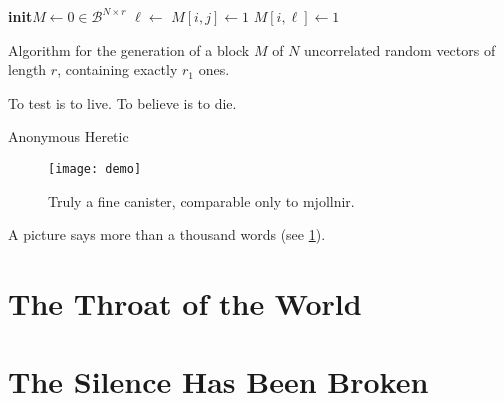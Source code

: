 \documentclass[a4paper,11pt]{memoir}
\begin{document}
\begin{algorithm}
	\small
	\begin{shaded}
		\begin{algorithmic}[1]
			\newcommand*{\To}{\textbf{to}\xspace}
			\newcommand*{\Init}{\State\textbf{init}\xspace}
			\newcommand*{\B}{\mathcal{B}}
			\Init \(M \gets 0 \in \B^{N \times r}\) 
			\For{ \(i \gets 1\) \To N}
				\For{ \(j \gets r - r_1 + 1\) \To \(r\)}
					\State \(\ell \gets \)  
						\State \({M}[i,j] \gets 1\)
					\Else
						\State \({M}[i,\ell] \gets 1\)
					\EndIf
				\EndFor
			\EndFor
		\end{algorithmic}
	\end{shaded}
	\caption[Uncorrelated random data generation]{Algorithm for the generation of a block $M$ of $N$ uncorrelated random vectors of length $r$, containing exactly $r_1$ ones.}
	\label{alg:binam_random_data}
\end{algorithm}

\epigraph{To test is to live. To believe is to die.}{Anonymous Heretic}
\blindtext

\begin{figure}
    \centering
    \texttt{[image: demo]}
    \caption{Truly a fine canister, comparable only to \gls{mjollnir}.}
    \label{fig:canister}
\end{figure}

\Blindtext\Blindtext

A picture says more than a thousand words (see \ref{fig:canister}).

\section{The Throat of the World}

\blindtext


\section{The Silence Has Been Broken}

\blindtext

\end{document}
